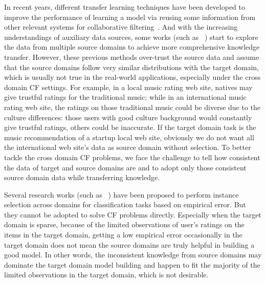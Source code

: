 In recent years, different transfer learning techniques have been developed to improve the performance of learning a model via reusing some information from other relevant systems for collaborative filtering~\cite{/ijcai/libin09,/uai/ZhangCY10}.
And with the increasing understandings of auxiliary data sources, some works (such as ~\cite{DBLP:conf/aaai/EldardiryN11,DBLP:conf/sdm/ShiPGY12}) start to explore the data from multiple source domains to achieve more comprehensive knowledge transfer.
However, these previous methods over-trust the source data and assume that the source domains follow very similar distributions with the target domain, which is usually not true in the real-world applications, especially under the cross domain CF settings.
For example, in a local music rating web site, natives may give trustful ratings for the traditional music; while in an international music rating web site, the ratings on those traditional music could be diverse due to the culture differences: those users with good culture background would constantly give trustful ratings, others could be inaccurate. If the target domain task is the music recommendation of a startup local web site, obviously we do not want all the international web site's data as source domain without selection. To better tackle the cross domain CF problems, we face the challenge to tell how consistent the data of target and source domains are and to adopt only those consistent source domain data while transferring knowledge.

Several research works (such as ~\cite{DBLP:conf/icml/DaiYXY07}) have been proposed to perform instance selection across domains for classification tasks based on empirical error. But they cannot be adopted to solve CF problems directly. Especially when the target domain is sparse, because of the limited observations of user's ratings on the items in the target domain, getting a low empirical error occasionally in the target domain does not mean the source domains are truly helpful in building a good model. In other words, the inconsistent knowledge from source domains may dominate the target domain model building and happen to fit the majority of the limited observations in the target domain, which is not desirable.

